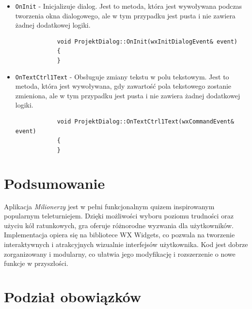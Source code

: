 \documentclass[]{article}
\begin{document}
	\begin{itemize}
		\item \texttt{OnInit} - Inicjalizuje dialog. Jest to metoda, która jest wywoływana podczas tworzenia okna dialogowego, ale w tym przypadku jest pusta i nie zawiera żadnej dodatkowej logiki.
		\begin{verbatim}
			void ProjektDialog::OnInit(wxInitDialogEvent& event)
			{
			}
		\end{verbatim}
		\item \texttt{OnTextCtrl1Text} - Obsługuje zmiany tekstu w polu tekstowym. Jest to metoda, która jest wywoływana, gdy zawartość pola tekstowego zostanie zmieniona, ale w tym przypadku jest pusta i nie zawiera żadnej dodatkowej logiki.
		\begin{verbatim}
			void ProjektDialog::OnTextCtrl1Text(wxCommandEvent& event)
			{
			}
		\end{verbatim}
	\end{itemize}
	
	\section{Podsumowanie}
	Aplikacja \emph{Milionerzy} jest w pełni funkcjonalnym quizem inspirowanym popularnym teleturniejem. Dzięki możliwości wyboru poziomu trudności oraz użyciu kół ratunkowych, gra oferuje różnorodne wyzwania dla użytkowników. Implementacja opiera się na bibliotece WX Widgets, co pozwala na tworzenie interaktywnych i atrakcyjnych wizualnie interfejsów użytkownika. Kod jest dobrze zorganizowany i modularny, co ułatwia jego modyfikację i rozszerzenie o nowe funkcje w przyszłości.
	
\newpage
\section{Podział obowiązków}
\end{document}
